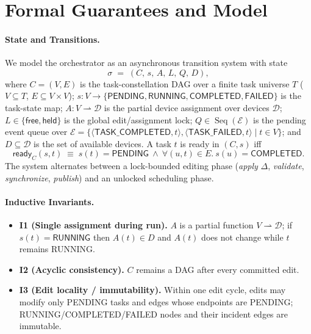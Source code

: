\documentclass[10pt]{article} %
\DeclareMathOperator{\Seq}{Seq}
\begin{document}
\appendix


\section{Formal Guarantees and Model}
\label{app:formal}

\paragraph{State and Transitions.}
We model the orchestrator as an asynchronous transition system with state
\[
\sigma \;=\; (C,\, s,\, A,\, L,\, Q,\, D),
\]
where $C=(V,E)$ is the task-constellation DAG over a finite task universe $T$ ($V\!\subseteq\!T$, $E\!\subseteq\!V\times V$); 
$s:V\to\{\textsf{PENDING},\textsf{RUNNING},\textsf{COMPLETED},\textsf{FAILED}\}$ is the task-state map; 
$A:V\rightharpoonup \mathcal{D}$ is the partial device assignment over devices $\mathcal{D}$; 
$L\in\{\textsf{free},\textsf{held}\}$ is the global edit/assignment lock; 
$Q\in\Seq(\mathcal{E})$ is the pending event queue over $\mathcal{E}=\{\langle\textsf{TASK\_COMPLETED},t\rangle,\langle\textsf{TASK\_FAILED},t\rangle\mid t\in V\}$; 
and $D\subseteq\mathcal{D}$ is the set of available devices.
A task $t$ is ready in $(C,s)$ iff
\[
\textsf{ready}_C(s,t)\;\equiv\; s(t)=\textsf{PENDING}\ \wedge\ \forall (u,t)\!\in\!E.\ s(u)=\textsf{COMPLETED}.
\]
The system alternates between a lock-bounded editing phase (\emph{apply} $\Delta$, \emph{validate}, \emph{synchronize}, \emph{publish}) and an unlocked scheduling phase.

\paragraph{Inductive Invariants.}
\begin{itemize}
  \item \textbf{I1 (Single assignment during run).} $A$ is a partial function $V\rightharpoonup\mathcal{D}$; if $s(t)=\textsf{RUNNING}$ then $A(t)\in D$ and $A(t)$ does not change while $t$ remains \textsf{RUNNING}.
  \item \textbf{I2 (Acyclic consistency).} $C$ remains a DAG after every committed edit.
  \item \textbf{I3 (Edit locality / immutability).} Within one edit cycle, edits may modify only \textsf{PENDING} tasks and edges whose endpoints are \textsf{PENDING}; \textsf{RUNNING}/\textsf{COMPLETED}/\textsf{FAILED} nodes and their incident edges are immutable.
\end{itemize}
\end{document}
